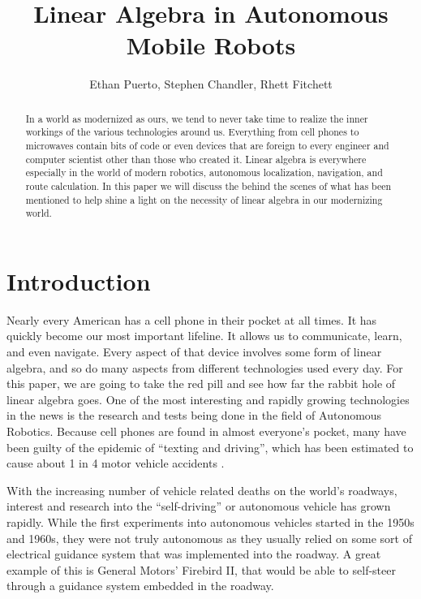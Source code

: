 \documentclass[12pt]{article}
\title{Linear Algebra in Autonomous Mobile Robots}
\author{Ethan Puerto, Stephen Chandler, Rhett Fitchett}
\begin{document}
\maketitle
\tableofcontents
\newpage
\begin{abstract}
In a world as modernized as ours, we tend to never take time to realize the inner workings of the various technologies around us. Everything from cell phones to microwaves contain bits of code or even devices that are foreign to every engineer and computer scientist other than those who created it. Linear algebra is everywhere especially in the world of modern robotics, autonomous localization, navigation, and route calculation. In this paper we will discuss the behind the scenes of what has been mentioned to help shine a light on the necessity of linear algebra in our modernizing world.
\end{abstract}

\newpage
\section{Introduction}
\quad Nearly every American has a cell phone in their pocket at all times. It has quickly become our most important lifeline. It allows us to communicate, learn, and even navigate. Every aspect of that device involves some form of linear algebra, and so do many aspects from different technologies used every day. For this paper, we are going to take the red pill and see how far the rabbit hole of linear algebra goes. One of the most interesting and rapidly growing technologies in the news is the research and tests being done in the field of Autonomous Robotics. Because cell phones are found in almost everyone’s pocket, many have been guilty of the epidemic of “texting and driving”, which has been estimated to cause about 1 in 4 motor vehicle accidents \cite{statistics}. \newline


With the increasing number of vehicle related deaths on the world’s roadways, interest and research into the “self-driving” or autonomous vehicle has grown rapidly. While the first experiments into autonomous vehicles started in the 1950s and 1960s, they were not truly autonomous as they usually relied on some sort of electrical guidance system that was implemented into the roadway. A great example of this is General Motors’ Firebird II, that would be able to self-steer through a guidance system embedded in the roadway. 
\newline
\end{document}

